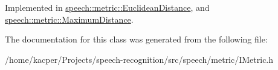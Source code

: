 Implemented in \hyperlink{classspeech_1_1metric_1_1EuclideanDistance_abd0d73ebf83dc218ab8f6ab5dee47064}{speech\+::metric\+::\+Euclidean\+Distance}, and \hyperlink{classspeech_1_1metric_1_1MaximumDistance_aa2c39fc82d79a701aecb8982ac0f2eaf}{speech\+::metric\+::\+Maximum\+Distance}.



The documentation for this class was generated from the following file\+:\begin{DoxyCompactItemize}
\item 
/home/kacper/\+Projects/speech-\/recognition/src/speech/metric/I\+Metric.\+h\end{DoxyCompactItemize}
